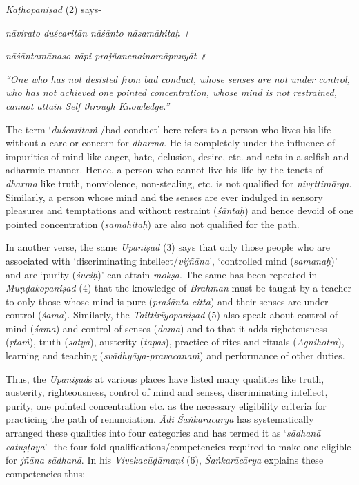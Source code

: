 \emph{Kaṭhopaniṣad} (2) says-

\emph{nāvirato duścaritān nāśānto nāsamāhitaḥ ।}

\emph{nāśāntamānaso vāpi prajñanenainamāpnuyāt ॥ }

\emph{``One who has not desisted from bad conduct, whose senses are not under control, who has not achieved one pointed concentration, whose mind is not restrained, cannot attain Self through Knowledge.''}

The term `\emph{duścaritaṁ} /bad conduct' here refers to a person who lives his life without a care or concern for \emph{dharma}. He is completely under the influence of impurities of mind like anger, hate, delusion, desire, etc. and acts in a selfish and adharmic manner. Hence, a person who cannot live his life by the tenets of \emph{dharma} like truth, nonviolence, non-stealing, etc. is not qualified for \emph{nivṛttimārga}. Similarly, a person whose mind and the senses are ever indulged in sensory pleasures and temptations and without restraint (\emph{śāntaḥ}) and hence devoid of one pointed concentration (\emph{samāhitaḥ}) are also not qualified for the path.

In another verse, the same \emph{Upaniṣad} (3) says that only those people who are associated with `discriminating intellect/\emph{vijñāna}', `controlled mind (\emph{samanaḥ})' and are `purity (\emph{śuciḥ})' can attain \emph{mokṣa}. The same has been repeated in \emph{Muṇḍakopaniṣad} (4) that the knowledge of \emph{Brahman} must be taught by a teacher to only those whose mind is pure (\emph{praśānta} \emph{citta}) and their senses are under control (\emph{śama}). Similarly, the \emph{Taittirīyopaniṣad} (5) also speak about control of mind (\emph{śama}) and control of senses (\emph{dama}) and to that it adds righetousness (\emph{ṛtaṁ}), truth (\emph{satya}), austerity (\emph{tapas}), practice of rites and rituals (\emph{Agnihotra}), learning and teaching (\emph{svādhyāya-pravacanaṁ}) and performance of other duties.

Thus, the \emph{Upaniṣad}s at various places have listed many qualities like truth, austerity, righteousness, control of mind and senses, discriminating intellect, purity, one pointed concentration etc. as the necessary eligibility criteria for practicing the path of renunciation. \emph{Ādi Śaṅkarācārya} has systematically arranged these qualities into four categories and has termed it as `\emph{sādhanā} \emph{catuṣṭaya}'- the four-fold qualifications/competencies required to make one eligible for \emph{jñāna} \emph{sādhanā}. In his \emph{Vivekacūḍāmaṇi} (6), \emph{Śaṅkarācārya} explains these competencies thus:

